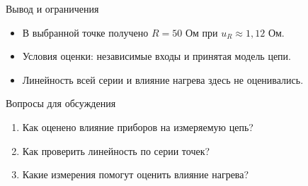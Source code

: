 \documentclass[14pt,aspectratio=169]{beamer}
\begin{document}
\begin{frame}{Вывод и ограничения}
    \begin{itemize}
        \item В выбранной точке получено $R=50$ Ом при $u_R\approx1{,}12$ Ом.
        \item Условия оценки: независимые входы и принятая модель цепи.
        \item Линейность всей серии и влияние нагрева здесь не оценивались.
    \end{itemize}
\end{frame}

\begin{frame}{Вопросы для обсуждения}
    \begin{enumerate}
        \item Как оценено влияние приборов на измеряемую цепь?
        \item Как проверить линейность по серии точек?
        \item Какие измерения помогут оценить влияние нагрева?
    \end{enumerate}
\end{frame}
\end{document}
